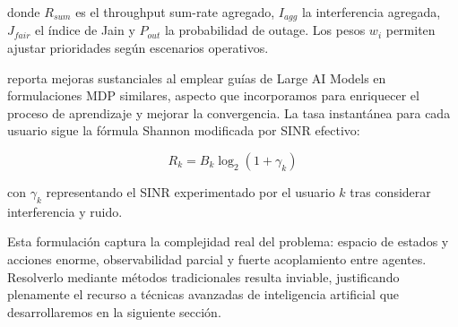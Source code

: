 donde $R_{sum}$ es el throughput sum-rate agregado, $I_{agg}$ la interferencia agregada, $J_{fair}$ el índice de Jain y $P_{out}$ la probabilidad de outage. Los pesos $w_i$ permiten ajustar prioridades según escenarios operativos.

\cite{Ibrahim2026} reporta mejoras sustanciales al emplear guías de Large AI Models en formulaciones MDP similares, aspecto que incorporamos para enriquecer el proceso de aprendizaje y mejorar la convergencia. La tasa instantánea para cada usuario sigue la fórmula Shannon modificada por SINR efectivo:

\begin{equation}
R_k = B_k \log_2(1 + \gamma_k)
\end{equation}

con $\gamma_k$ representando el SINR experimentado por el usuario $k$ tras considerar interferencia y ruido.

Esta formulación captura la complejidad real del problema: espacio de estados y acciones enorme, observabilidad parcial y fuerte acoplamiento entre agentes. Resolverlo mediante métodos tradicionales resulta inviable, justificando plenamente el recurso a técnicas avanzadas de inteligencia artificial que desarrollaremos en la siguiente sección.